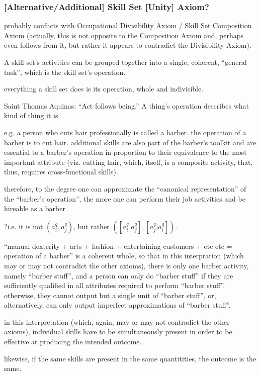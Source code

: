 \documentclass{elsarticle} %
\begin{document}
\subsubsection{[Alternative/Additional] Skill Set [Unity] Axiom?}
probably conflicts with Occupational Divisibility Axiom / Skill Set Composition
Axiom (actually, this is not opposite to the Composition Axiom and, perhaps
even follows from it, but rather it appears to contradict the Divisibility
Axiom).

A skill set's activities can be grouped together into a single, coherent,
``general task'', which is the skill set's operation.

everything a skill set does is its operation, whole and indivisible.

Saint Thomas Aquinas: ``Act follows being.'' A thing's operation describes what
kind of thing it is.

e.g. a person who cuts hair professionally is called a barber. the operation of
a barber is to cut hair. additional skills are also part of the barber's
toolkit and are essential to a barber's operation in proportion to their
equivalence to the most important attribute (viz. cutting hair, which, itself,
is a composite activity, that, thus, requires cross-functional skills).

therefore, to the degree one can approximate the ``canonical representation''
of the ``barber's operation'', the more one can perform their job activities
and be hireable as a barber

?i.e. it is not $(a_{i}^{q}, a_{j}^{q})$, but rather $([a_{i}^{q} | a_{j}^{q}], [a_{j}^{q} | a_{i}^{q}])$.

``manual dexterity + arts + fashion + entertaining customers + etc etc = operation of a barber'' is a coherent whole, so that in this interpration (which may or may not contradict the other axioms), there is only one barber activity, namely ``barber stuff'', and a person can only do ``barber stuff'' if they are sufficiently qualified in all attributes required to perform ``barber stuff''. otherwise, they cannot output but a single unit of ``barber stuff'', or, alternatively, can only output imperfect approximations of ``barber stuff''.

in this interpretation (which, again, may or may not contradict the other
axioms), individual skills have to be simultaneously present in order to be
effective at producing the intended outcome.

likewise, if the same skills are present in the same quantitities, the outcome
is the same.
\end{document}
